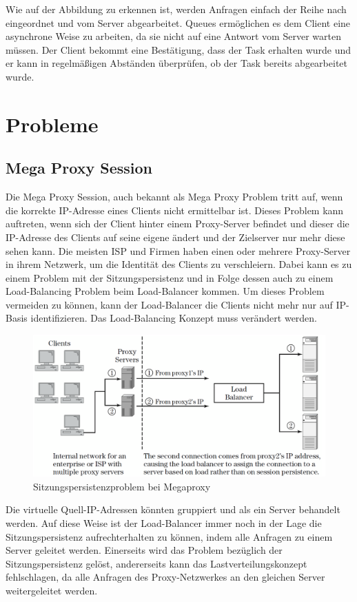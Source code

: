 Wie auf der Abbildung zu erkennen ist, werden Anfragen einfach der Reihe nach eingeordnet und vom Server abgearbeitet. Queues ermöglichen es dem Client eine asynchrone Weise zu arbeiten, da sie nicht auf eine Antwort vom Server warten müssen.
Der Client bekommt eine Bestätigung, dass der Task erhalten wurde und er kann in regelmäßigen Abständen überprüfen, ob der Task bereits abgearbeitet wurde.
\cite{Queues}

\section{Probleme}
\label{sec:Probleme}

\subsection{Mega Proxy Session}
\label{sec:Mega Proxy Session}
Die Mega Proxy Session, auch bekannt als Mega Proxy Problem tritt auf, wenn die korrekte IP-Adresse eines Clients nicht ermittelbar ist. Dieses Problem kann auftreten, wenn sich der Client hinter einem Proxy-Server befindet und dieser die IP-Adresse des Clients auf seine eigene ändert und der Zielserver nur mehr diese sehen kann. Die meisten ISP und Firmen haben einen oder mehrere Proxy-Server in ihrem Netzwerk, um die Identität des Clients zu verschleiern. Dabei kann es zu einem Problem mit der Sitzungspersistenz und in Folge dessen auch zu einem Load-Balancing Problem beim Load-Balancer kommen. Um dieses Problem vermeiden zu können, kann der Load-Balancer die Clients nicht mehr nur auf IP-Basis identifizieren. Das Load-Balancing Konzept muss verändert werden.

\begin{figure}[!ht]
	\begin{center}
		\includegraphics[width=0.5\linewidth]{images/MegaProxy1.png}
		\caption{Sitzungspersistenzproblem bei Megaproxy \cite{LoadBalancing2}}
		\label{Sitzungspersistenzproblem_bei_Megaproxy}
	\end{center}
\end{figure}

Die virtuelle Quell-IP-Adressen könnten gruppiert und als ein Server behandelt werden. Auf diese Weise ist der Load-Balancer immer noch in der Lage die Sitzungspersistenz aufrechterhalten zu können, indem alle Anfragen zu einem Server geleitet werden.
Einerseits wird das Problem bezüglich der Sitzungspersistenz gelöst, andererseits kann das Lastverteilungskonzept fehlschlagen, da alle Anfragen des Proxy-Netzwerkes an den gleichen Server weitergeleitet werden.
\cite{LoadBalancing2}

